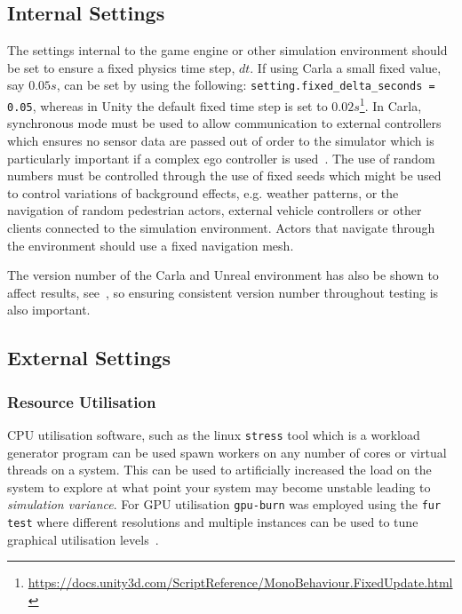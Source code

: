\documentclass[letterpaper, 10 pt, journal, twoside]{IEEEtran}
\begin{document}
\subsection{Internal Settings}
The settings internal to the game engine or other simulation environment should be set to ensure a fixed physics time step, $dt$. If using Carla a small fixed value, say $0.05s$, can be set by using the following: \texttt{setting.fixed\_delta\_seconds = 0.05}, whereas in Unity the default fixed time step is set to $0.02s$\footnote{\url{https://docs.unity3d.com/ScriptReference/MonoBehaviour.FixedUpdate.html}}. In Carla, synchronous mode must be used to allow communication to external controllers which ensures no sensor data are passed out of order to the simulator which is particularly important if a complex ego controller is used~\cite{carla_sim_config}. 
%
The use of random numbers must be controlled through the use of fixed seeds which might be used to control variations of background effects, e.g. weather patterns, or the navigation of random pedestrian actors, external vehicle controllers or other clients connected to the simulation environment. 
%
Actors that navigate through the environment should use a fixed navigation mesh.

The version number of the Carla and Unreal environment has also be shown to affect results, see~\cite{TSLUnrealEngineTesting}, so ensuring consistent version number throughout testing is also important.



\subsection{External Settings}

\subsubsection{Resource Utilisation}
CPU utilisation software, such as the linux \texttt{stress} tool which is a workload generator program can be used spawn workers on any number of cores or virtual threads on a system. This can be used to artificially increased the load on the system to explore at what point your system may become unstable leading to \textit{simulation variance}. For GPU utilisation \texttt{gpu-burn} was employed using the \texttt{fur test} where different resolutions and multiple instances can be used to tune graphical utilisation levels~\cite{GPU_stress}. 
\end{document}

